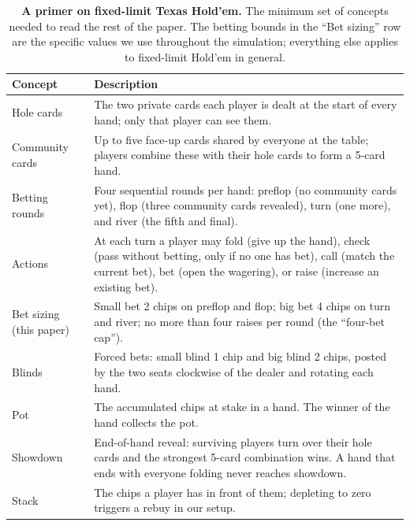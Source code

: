 \documentclass[10pt,twocolumn,letterpaper]{article}
\begin{document}
\begin{table}[t]
\centering
{}
\caption{\textbf{A primer on fixed-limit Texas Hold'em.} The
minimum set of concepts needed to read the rest of the paper. The
betting bounds in the ``Bet sizing'' row are the specific values
we use throughout the simulation; everything else applies to
fixed-limit Hold'em in general.}
\label{tab:poker-primer}
\small
\begin{tabularx}{\textwidth}{@{}lX@{}}
\toprule
Concept & Description \\
\midrule
Hole cards & The two private cards each player is dealt at the start of every hand; only that player can see them. \\
Community cards & Up to five face-up cards shared by everyone at the table; players combine these with their hole cards to form a 5-card hand. \\
Betting rounds & Four sequential rounds per hand: preflop (no community cards yet), flop (three community cards revealed), turn (one more), and river (the fifth and final). \\
Actions & At each turn a player may fold (give up the hand), check (pass without betting, only if no one has bet), call (match the current bet), bet (open the wagering), or raise (increase an existing bet). \\
Bet sizing (this paper) & Small bet 2 chips on preflop and flop; big bet 4 chips on turn and river; no more than four raises per round (the ``four-bet cap''). \\
Blinds & Forced bets: small blind 1 chip and big blind 2 chips, posted by the two seats clockwise of the dealer and rotating each hand. \\
Pot & The accumulated chips at stake in a hand. The winner of the hand collects the pot. \\
Showdown & End-of-hand reveal: surviving players turn over their hole cards and the strongest 5-card combination wins. A hand that ends with everyone folding never reaches showdown. \\
Stack & The chips a player has in front of them; depleting to zero triggers a rebuy in our setup. \\
\bottomrule
\end{tabularx}
\end{table}
\end{document}
